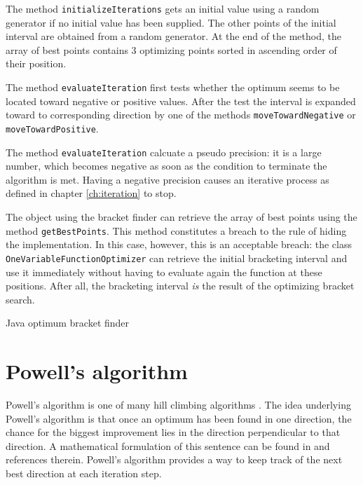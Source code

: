 \documentclass[twoside]{book}
\begin{document}
The method {\tt initializeIterations} gets an initial value using
a random generator if no initial value has been supplied. The
other points of the initial interval are obtained from a random
generator. At the end of the method, the array of best points
contains 3 optimizing points sorted in ascending order of their
position.

The method {\tt evaluateIteration} first tests whether the optimum
seems to be located toward negative or positive values. After the
test the interval is expanded toward to corresponding direction by
one of the methods {\tt moveTowardNegative} or  {\tt
moveTowardPositive}.

The method {\tt evaluateIteration} calcuate a pseudo precision: it
is a large number, which becomes negative as soon as the condition
to terminate the algorithm is met. Having a negative precision
causes an iterative process as defined in chapter
\ref{ch:iteration} to stop.

The object using the bracket finder can retrieve the array of best
points using the method {\tt getBestPoints}. This method
constitutes a breach to the rule of hiding the implementation. In
this case, however, this is an acceptable breach: the class {\tt
OneVariableFunctionOptimizer} can retrieve the initial bracketing
interval and use it immediately without having to evaluate again
the function at these positions. After all, the bracketing
interval {\sl is} the result of the optimizing bracket search.

\begin{listing} Java optimum bracket finder
\label{lj:optimizerbracket}

\end{listing}

\section{Powell's algorithm}
\label{sec:powell}Powell's algorithm is one of many hill climbing
algorithms \cite{Press}. The idea underlying Powell's algorithm is
that once an optimum has been found in one direction, the chance
for the biggest improvement lies in the direction perpendicular to
that direction. A mathematical formulation of this sentence can be
found in \cite{Press} and references therein. Powell's algorithm
provides a way to keep track of the next best direction at each
iteration step.
\end{document}
